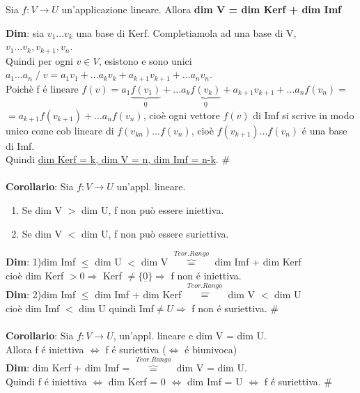 \documentclass[12pt]{article}
\begin{document}
\begin{theorem}
Sia $f:V \longrightarrow U$ un'applicazione lineare.
Allora \textbf{dim V = dim Kerf + dim Imf}
\label{teorema del rango}
\end{theorem}
\textbf{Dim}: sia $v_1...v_k$ una base di Kerf. Completiamola ad una base di V, $v_1...v_k, v_{k+1}, v_n$.\\
Quindi per ogni $v\in V$, esistono e sono unici $a_1...a_n \;/\; v = a_1v_1+...a_kv_k+a_{k+1}v_{k+1}+...a_nv_n$.\\
Poichè f é lineare 
$f(v) = a_1\underbrace{f(v_1)}_{\underline{0}}+...a_k\underbrace{f(v_k)}_{\underline 0}+a_{k+1}v_{k+1}+...a_nf(v_n) = $\\
$=a_{k+1}f(v_{k+1})+...a_nf(v_n)$, cioè ogni vettore $f(v)$ di Imf si scrive in modo unico come cob lineare di $f(v_{kn})...f(v_n)$, cioè $f(v_{k+1})...f(v_n)$ é una base di Imf.\\ Quindi \underline{dim Kerf = k, dim V = n, dim Imf = n-k}.  \#\\\\
\textbf{Corollario}: Sia $f:V\longrightarrow U$ un'appl. lineare.
\begin{enumerate}
    \item Se dim V $>$ dim U, f non può essere iniettiva.
    \item Se dim V $<$ dim U, f non può essere suriettiva.
\end{enumerate}
\textbf{Dim}: 1)dim Imf $\leq$ dim U $<$ dim V $\overbrace{=}^{Teor. Rango}$ dim Imf + dim Kerf\\
cioè dim Kerf $> 0 \Rightarrow$  Kerf $\neq \{\underline 0\} \Rightarrow$ f non é iniettiva.\\
\textbf{Dim}: 2)dim Imf $\leq$ dim Imf + dim Kerf $\overbrace{=}^{Teor.Rango}$ dim V $<$ dim U\\
cioè dim Imf $<$ dim U quindi Imf$\neq U \Rightarrow$ f non é suriettiva. \# \\\\
\textbf{Corollario}: Sia $f:V\longrightarrow U$, un'appl. lineare e dim V = dim U.\\
Allora f é iniettiva $\iff$ f é suriettiva ($\iff$ é biunivoca)\\
\textbf{Dim}: dim Kerf + dim Imf = $\overbrace{=}^{Teor.Rango}$ dim V = dim U.\\
Quindi f é iniettiva $\iff$ dim Kerf = 0 $\iff$ dim Imf = U $\iff$ f é suriettiva. \#
\end{document}
